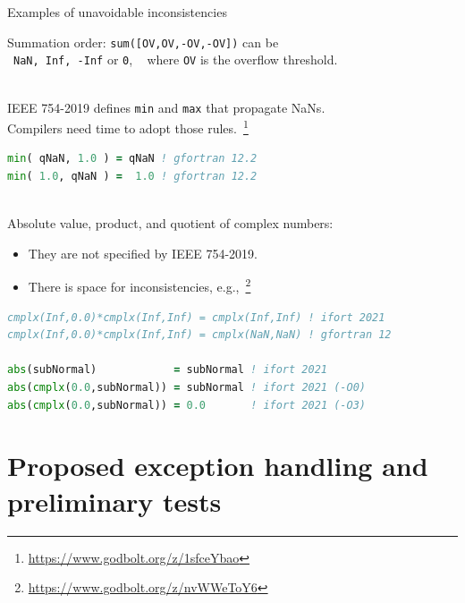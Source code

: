 \documentclass[11pt]{beamer}
\newcommand{\cpp}{{C\texttt{++}}}
\begin{document}

\begin{frame}[fragile]{Examples of unavoidable inconsistencies}

	Summation order: \texttt{sum([OV,OV,-OV,-OV])} can be\\
	~\texttt{NaN, Inf, -Inf} or \texttt{0}, ~ where \texttt{OV} is the overflow threshold.

	
	~\\
	IEEE 754-2019 defines \texttt{min} and \texttt{max} that propagate NaNs.\\
	Compilers need time to adopt those rules.~\footnote{\url{https://www.godbolt.org/z/1sfceYbao}}
	\begin{lstlisting}[language=Fortran]
min( qNaN, 1.0 ) = qNaN ! gfortran 12.2
min( 1.0, qNaN ) =  1.0 ! gfortran 12.2\end{lstlisting}
	
	~\\
	Absolute value, product, and quotient of complex numbers:
	\begin{itemize}
		\item They are not specified by IEEE 754-2019.
		\item There is space for inconsistencies, e.g.,~\footnote{\url{https://www.godbolt.org/z/nvWWeToY6}}
	\end{itemize}
	\begin{lstlisting}[language=Fortran]
cmplx(Inf,0.0)*cmplx(Inf,Inf) = cmplx(Inf,Inf) ! ifort 2021
cmplx(Inf,0.0)*cmplx(Inf,Inf) = cmplx(NaN,NaN) ! gfortran 12

abs(subNormal)            = subNormal ! ifort 2021
abs(cmplx(0.0,subNormal)) = subNormal ! ifort 2021 (-O0)
abs(cmplx(0.0,subNormal)) = 0.0       ! ifort 2021 (-O3)\end{lstlisting}

\end{frame}

\section{Proposed exception handling and preliminary tests}
\end{document}
